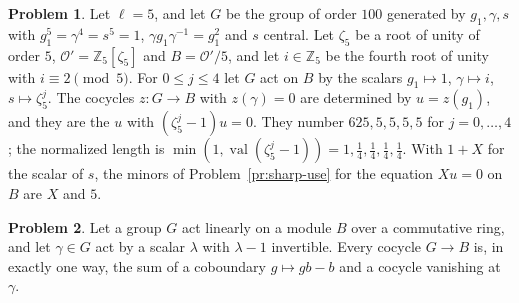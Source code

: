 \documentclass[reqno]{amsart}
\theoremstyle{definition}
\newtheorem{problem}{Problem}[section]
\theoremstyle{plain}
\newcommand{\Z}{\mathbb{Z}}
\newcommand{\val}{\operatorname{val}}
\newcommand{\Oc}{\mathcal{O}}
\begin{document}
\begin{problem}\label{pr:model}
Let \(\ell = 5\), and let \(G\) be the group of order \(100\) generated by \(g_1, \gamma, s\) with \(g_1^5 = \gamma^4 = s^5 = 1\), \(\gamma g_1 \gamma^{-1} = g_1^2\) and \(s\) central.  Let \(\zeta_5\) be a root of unity of order \(5\), \(\Oc' = \Z_5[\zeta_5]\) and \(B = \Oc'/5\), and let \(i \in \Z_5\) be the fourth root of unity with \(i \equiv 2 \pmod 5\).  For \(0 \le j \le 4\) let \(G\) act on \(B\) by the scalars \(g_1 \mapsto 1\), \(\gamma \mapsto i\), \(s \mapsto \zeta_5^j\).  The cocycles \(z \colon G \to B\) with \(z(\gamma) = 0\) are determined by \(u = z(g_1)\), and they are the \(u\) with \((\zeta_5^j - 1)u = 0\).  They number \(625, 5, 5, 5, 5\) for \(j = 0, \dots, 4\); the normalized length is \(\min(1, \val(\zeta_5^j - 1)) = 1, \tfrac14, \tfrac14, \tfrac14, \tfrac14\).  With \(1 + X\) for the scalar of \(s\), the minors of Problem~\ref{pr:sharp-use} for the equation \(Xu = 0\) on \(B\) are \(X\) and \(5\).
\end{problem}

\begin{problem}\label{pr:normalize}
Let a group \(G\) act linearly on a module \(B\) over a commutative ring, and let \(\gamma \in G\) act by a scalar \(\lambda\) with \(\lambda - 1\) invertible.  Every cocycle \(G \to B\) is, in exactly one way, the sum of a coboundary \(g \mapsto gb - b\) and a cocycle vanishing at \(\gamma\).
\end{problem}
\end{document}
